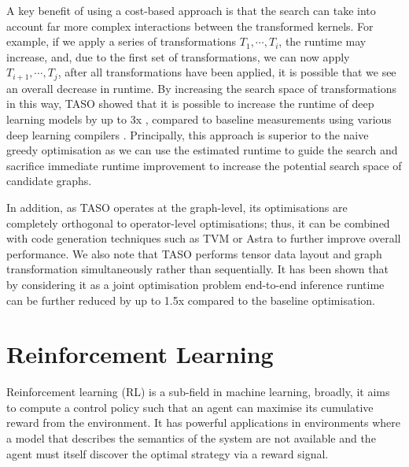 

A key benefit of using a cost-based approach is that the search can take into account far more complex interactions between the transformed kernels. For example, if we apply a series of transformations $T_1, \cdots, T_i$, the runtime may increase, and, due to the first set of transformations, we can now apply $T_{i + 1}, \cdots, T_{j}$, after all transformations have been applied, it is possible that we see an overall decrease in runtime. By increasing the search space of transformations in this way, TASO showed that it is possible to increase the runtime of deep learning models by up to 3x \cite{jia2019taso, jia2019optimizing}, compared to baseline measurements using various deep learning compilers \cite{ chetlur2014cudnn, cublas2008, tensorrt2017}. Principally, this approach is superior to the naive greedy optimisation as we can use the estimated runtime to guide the search and sacrifice immediate runtime improvement to increase the potential search space of candidate graphs.


In addition, as TASO operates at the graph-level, its optimisations are completely orthogonal to operator-level optimisations; thus, it can be combined with code generation techniques such as TVM \cite{chen2018tvm} or Astra \cite{sivathanu2019astra} to further improve overall performance. We also note that TASO performs tensor data layout and graph transformation simultaneously rather than sequentially. It has been shown that by considering it as a joint optimisation problem end-to-end inference runtime can be further reduced by up to 1.5x \cite{jia2019taso, jia2019optimizing} compared to the baseline optimisation.


\section{Reinforcement Learning}
Reinforcement learning (RL) is a sub-field in machine learning, broadly, it aims to compute a control policy such that an agent can maximise its cumulative reward from the environment. It has powerful applications in environments where a model that describes the semantics of the system are not available and the agent must itself discover the optimal strategy via a reward signal.

